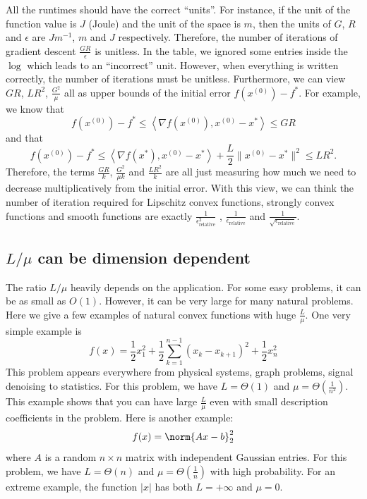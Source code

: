 All the runtimes should have the correct ``units''. For instance,
if the unit of the function value is $J$ (Joule) and the unit of
the space is $m$, then the units of $G$, $R$ and $\epsilon$ are
$Jm^{-1}$, $m$ and $J$ respectively. Therefore, the number of iterations
of gradient descent $\frac{GR}{\epsilon}$ is unitless. In the table,
we ignored some entries inside the $\log$ which leads to an ``incorrect''
unit. However, when everything is written correctly, the number of
iterations must be unitless. Furthermore, we can view $GR$, $LR^{2}$,
$\frac{G^{2}}{\mu}$ all as upper bounds of the initial error $f(x^{(0)})-f^{*}$.
For example, we know that
\[
f(x^{(0)})-f^{*}\leq\left\langle \nabla f(x^{(0)}),x^{(0)}-x^{*}\right\rangle \leq GR
\]
and that
\[
f(x^{(0)})-f^{*}\leq\left\langle \nabla f(x^{*}),x^{(0)}-x^{*}\right\rangle +\frac{L}{2}\|x^{(0)}-x^{*}\|^{2}\leq LR^{2}.
\]
Therefore, the terms $\frac{GR}{k}$, $\frac{G^{2}}{\mu k}$ and $\frac{LR^{2}}{k}$
are all just measuring how much we need to decrease multiplicatively
from the initial error. With this view, we can think the number of
iteration required for Lipschitz convex functions, strongly convex
functions and smooth functions are exactly $\frac{1}{\epsilon_{\mathrm{relative}}^{2}}$
, $\frac{1}{\epsilon_{\mathrm{relative}}}$ and $\frac{1}{\sqrt{\epsilon_{\mathrm{relative}}}}$.

\subsection{$L/\mu$ can be dimension dependent}

The ratio $L/\mu$ heavily depends on the application. For some easy
problems, it can be as small as $O(1)$. However, it can be very large
for many natural problems. Here we give a few examples of natural
convex functions with huge $\frac{L}{\mu}$. One very simple example
is 
\[
f(x)=\frac{1}{2}x_{1}^{2}+\frac{1}{2}\sum_{k=1}^{n-1}(x_{k}-x_{k+1})^{2}+\frac{1}{2}x_{n}^{2}
\]
This problem appears everywhere from physical systems, graph problems,
signal denoising to statistics. For this problem, we have $L=\Theta(1)$
and $\mu=\Theta(\frac{1}{n^{2}})$. This example shows that you can
have large $\frac{L}{\mu}$ even with small description coefficients
in the problem. Here is another example:
\[
f(x)=\norm{Ax-b}_{2}^{2}
\]
where $A$ is a random $n\times n$ matrix with independent Gaussian
entries. For this problem, we have $L=\Theta(n)$ and $\mu=\Theta(\frac{1}{n})$
with high probability. For an extreme example, the function $|x|$
has both $L=+\infty$ and $\mu=0$. 

